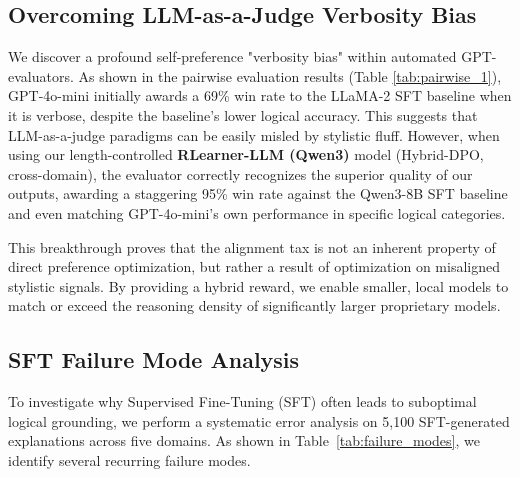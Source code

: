 \subsection{Overcoming LLM-as-a-Judge Verbosity Bias}
We discover a profound self-preference "verbosity bias" within automated GPT-evaluators. As shown in the pairwise evaluation results (Table \ref{tab:pairwise_1}), GPT-4o-mini initially awards a 69\% win rate to the LLaMA-2 SFT baseline when it is verbose, despite the baseline's lower logical accuracy. This suggests that LLM-as-a-judge paradigms can be easily misled by stylistic fluff. However, when using our length-controlled \textbf{RLearner-LLM (Qwen3)} model (Hybrid-DPO, cross-domain), the evaluator correctly recognizes the superior quality of our outputs, awarding a staggering 95\% win rate against the Qwen3-8B SFT baseline and even matching GPT-4o-mini's own performance in specific logical categories.

\begin{table}[h]
\centering
{}
\caption{Blind Pairwise evaluation results vs. GPT-4o-mini.}
\label{tab:pairwise_1}
\end{table}

This breakthrough proves that the alignment tax is not an inherent property of direct preference optimization, but rather a result of optimization on misaligned stylistic signals. By providing a hybrid reward, we enable smaller, local models to match or exceed the reasoning density of significantly larger proprietary models.

\subsection{SFT Failure Mode Analysis}
To investigate why Supervised Fine-Tuning (SFT) often leads to suboptimal logical grounding, we perform a systematic error analysis on 5,100 SFT-generated explanations across five domains. As shown in Table~\ref{tab:failure_modes}, we identify several recurring failure modes. 

